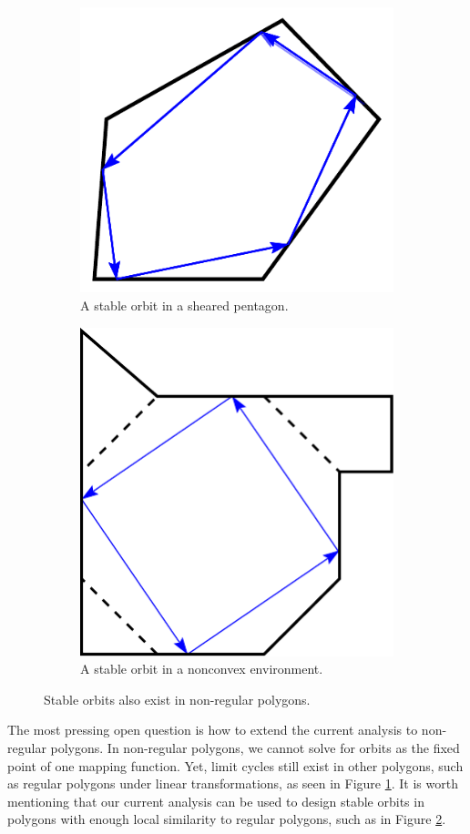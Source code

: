 \documentclass[letterpaper, 10 pt, conference]{ieeeconf}  %
\begin{document}
\begin{figure}
\begin{subfigure}{.25\textwidth}
\centering
\includegraphics[width=0.8\linewidth]{figs/shear.pdf}
\caption{A stable orbit in a sheared pentagon.}
\label{shear}
\end{subfigure}%
\begin{subfigure}{0.25\textwidth}
\centering
\includegraphics[width=0.6\linewidth]{figs/oct.pdf}
\caption{A stable orbit in a nonconvex environment.}
\label{oct}
\end{subfigure}
\caption{Stable orbits also exist in non-regular polygons. }
\label{squish-shear}
\end{figure}

The most pressing open question is how to extend the current analysis to 
non-regular polygons. In non-regular polygons, we cannot 
solve for orbits as the fixed point of one
mapping function. Yet, limit cycles still exist in other polygons, such as
regular polygons under linear transformations, as seen in Figure \ref{shear}.
It is worth mentioning that our current analysis can be used to design stable
orbits in polygons with enough local similarity to regular polygons, such
as in Figure \ref{oct}.
\end{document}
